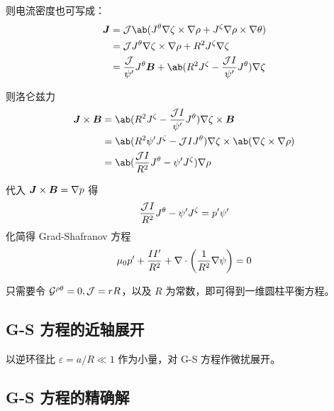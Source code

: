 则电流密度也可写成：
\begin{equation}\begin{aligned}
\vector{J} &= \Jacobian \ab(
    J^\theta \grad{\zeta} \times \grad{\rho}
    + J^\zeta \grad{\rho} \times \grad{\theta}
) \\
&= \Jacobian J^\theta \grad{\zeta} \times \grad{\rho}
+ R^2 J^\zeta \grad{\zeta} \\
&= \frac{\Jacobian}{\ToroidalFlux'} J^\theta \vector{B}
+ \ab(R^2 J^\zeta - \frac{\Jacobian I}{\ToroidalFlux'} J^\theta) \grad{\zeta}
\end{aligned}\end{equation}

则洛仑兹力
\begin{equation}\begin{aligned}
\vector{J} \times \vector{B}
&= \ab(R^2 J^\zeta - \frac{\Jacobian I}{\ToroidalFlux'} J^\theta)
\grad{\zeta} \times \vector{B} \\
&= \ab(R^2 \ToroidalFlux' J^\zeta - \Jacobian I J^\theta)
\grad{\zeta} \times \ab(\grad{\zeta} \times \grad{\rho}) \\
&= \ab(\frac{\Jacobian I}{R^2} J^\theta - \ToroidalFlux' J^\zeta) \grad{\rho}
\end{aligned}\end{equation}

代入 $\bm{J} \times \bm{B} = \nabla {p}$ 得
\begin{equation}
\frac{\mathcal{J} I}{R^2} J^\theta - \psi' J^\zeta = p' \psi'
\end{equation}
化简得 Grad-Shafranov 方程
\begin{equation}
\mu_0 p' + \frac{I I'}{R^2} + \nabla \cdot {\left( \frac{1}{R^2} \nabla {\psi} \right)} = 0
\end{equation}

只需要令 ${\mathcal{G}}^{\rho\theta} = 0, \mathcal{J} = r R$，以及 $R$ 为常数，即可得到一维圆柱平衡方程。

\subsection{G-S 方程的近轴展开}

以逆环径比 $\varepsilon = a / R \ll 1$ 作为小量，对 G-S 方程作微扰展开。

\subsection{G-S 方程的精确解}

